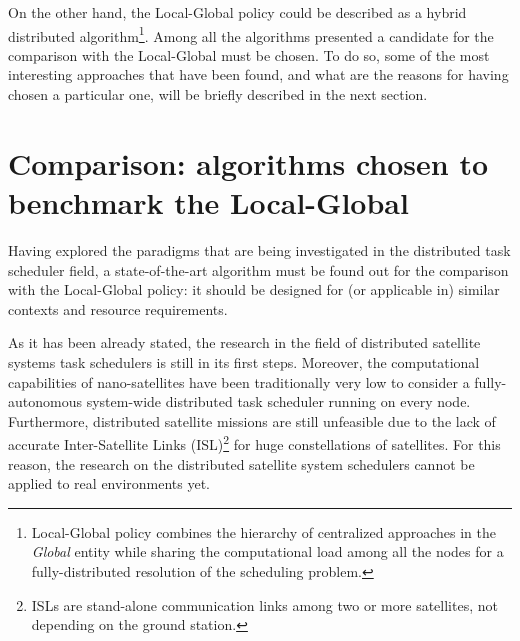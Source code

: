 

On the other hand, the Local-Global policy could be described as a hybrid distributed algorithm\footnote{Local-Global policy combines the hierarchy of centralized approaches in the \emph{Global} entity while sharing the computational load among all the nodes for a fully-distributed resolution of the scheduling problem.}. Among all the algorithms presented a candidate for the comparison with the Local-Global must be chosen. To do so, some of the most interesting approaches that have been found, and what are the reasons for having chosen a particular one, will be briefly described in the next section.


\section{Comparison: algorithms chosen to benchmark the Local-Global}

Having explored the paradigms that are being investigated in the distributed task scheduler field, a state-of-the-art algorithm must be found out for the comparison with the Local-Global policy: it should be designed for (or applicable in) similar contexts and resource requirements.

As it has been already stated, the research in the field of distributed satellite systems task schedulers is still in its first steps. Moreover, the computational capabilities of nano-satellites have been traditionally very low to consider a fully-autonomous system-wide distributed task scheduler running on every node. Furthermore, distributed satellite missions are still unfeasible due to the lack of accurate Inter-Satellite Links (ISL)\footnote{ISLs are stand-alone communication links among two or more satellites, not depending on the ground station.} for huge constellations of satellites. For this reason, the research on the distributed satellite system schedulers cannot be applied to real environments yet.

